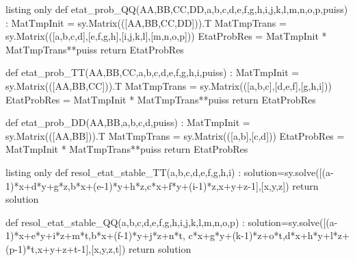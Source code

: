 \documentclass[french,a4paper,11pt]{article}
\begin{document}
\begin{PresentationCodePython}{listing only}
def etat_prob_QQ(AA,BB,CC,DD,a,b,c,d,e,f,g,h,i,j,k,l,m,n,o,p,puiss) :
	MatTmpInit = sy.Matrix(([AA,BB,CC,DD])).T
	MatTmpTrans = sy.Matrix(([a,b,c,d],[e,f,g,h],[i,j,k,l],[m,n,o,p]))
	EtatProbRes = MatTmpInit * MatTmpTrans**puiss
	return EtatProbRes

def etat_prob_TT(AA,BB,CC,a,b,c,d,e,f,g,h,i,puiss) :
	MatTmpInit = sy.Matrix(([AA,BB,CC])).T
	MatTmpTrans = sy.Matrix(([a,b,c],[d,e,f],[g,h,i]))
	EtatProbRes = MatTmpInit * MatTmpTrans**puiss
	return EtatProbRes

def etat_prob_DD(AA,BB,a,b,c,d,puiss) :
	MatTmpInit = sy.Matrix(([AA,BB])).T
	MatTmpTrans = sy.Matrix(([a,b],[c,d]))
	EtatProbRes = MatTmpInit * MatTmpTrans**puiss
	return EtatProbRes
\end{PresentationCodePython}

\begin{PresentationCodePython}{listing only}
def resol_etat_stable_TT(a,b,c,d,e,f,g,h,i) :
	solution=sy.solve([(a-1)*x+d*y+g*z,b*x+(e-1)*y+h*z,c*x+f*y+(i-1)*z,x+y+z-1],[x,y,z])
	return solution

def resol_etat_stable_QQ(a,b,c,d,e,f,g,h,i,j,k,l,m,n,o,p) :
	solution=sy.solve([(a-1)*x+e*y+i*z+m*t,b*x+(f-1)*y+j*z+n*t,
	c*x+g*y+(k-1)*z+o*t,d*x+h*y+l*z+(p-1)*t,x+y+z+t-1],[x,y,z,t])
	return solution
\end{PresentationCodePython}
\end{document}
